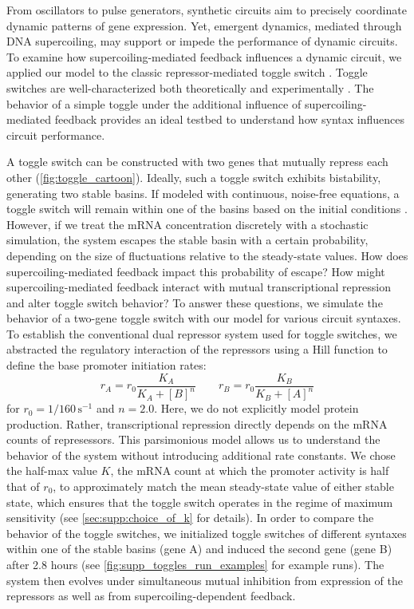 \documentclass[11pt]{article}
\begin{document}
From oscillators to pulse generators, synthetic circuits aim to precisely coordinate dynamic patterns of gene expression. Yet, emergent dynamics, mediated through DNA supercoiling, may support or impede the performance of dynamic circuits. To examine how supercoiling-mediated feedback influences a dynamic circuit, we applied our model to the classic repressor-mediated toggle switch \parencite{gardnerConstructionGeneticToggle2000}. Toggle switches are well-characterized both theoretically \parencite{gardnerConstructionGeneticToggle2000} and experimentally \parencite{gardnerConstructionGeneticToggle2000,yeungBiophysicalConstraintsArising2017,zhuSyntheticMultistabilityMammalian2021}. The behavior of a simple toggle under the additional influence of supercoiling-mediated feedback provides an ideal testbed to understand how syntax influences circuit performance.

A toggle switch can be constructed with two genes that mutually repress each other (\cref{fig:toggle_cartoon}). Ideally, such a toggle switch exhibits bistability, generating two stable basins. If modeled with continuous, noise-free equations, a toggle switch will remain within one of the basins based on the initial conditions \parencite{gardnerConstructionGeneticToggle2000}. However, if we treat the mRNA concentration discretely with a stochastic simulation, the system escapes the stable basin with a certain probability, depending on the size of fluctuations relative to the steady-state values. How does supercoiling-mediated feedback impact this probability of escape? How might supercoiling-mediated feedback interact with mutual transcriptional repression and alter toggle switch behavior?
To answer these questions, we simulate the behavior of a two-gene toggle switch with our model for various circuit syntaxes. To establish the conventional dual repressor system used for toggle switches, we abstracted the regulatory interaction of the repressors using a Hill function to define the base promoter initiation rates:
\begin{equation}
    r_A = r_0 \frac{K_A}{K_A + [B]^n} \qquad r_B = r_0 \frac{K_B}{K_B + [A]^n}
\end{equation}
for \(r_0 = 1/160 \,\text{s}^{-1}\) and \(n = 2.0\). Here, we do not explicitly model protein production. Rather, transcriptional repression directly depends on the mRNA counts of represessors. This parsimonious model allows us to understand the behavior of the system without introducing additional rate constants. We chose the half-max value \(K\), the mRNA count at which the promoter activity is half that of \(r_0\), to approximately match the mean steady-state value of either stable state, which ensures that the toggle switch operates in the regime of maximum sensitivity (see \cref{sec:supp:choice_of_k} for details). In order to compare the behavior of the toggle switches, we initialized toggle switches of different syntaxes within one of the stable basins (gene A) and induced the second gene (gene B) after 2.8 hours (see \cref{fig:supp_toggles_run_examples} for example runs). The system then evolves under simultaneous mutual inhibition from expression of the repressors as well as from supercoiling-dependent feedback.
\end{document}
